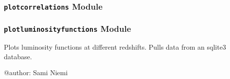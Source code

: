 \documentclass[letterpaper,10pt,english]{sphinxmanual}
\begin{document}
\begin{fulllineitems}
\label{SamPy.herschel:SamPy.herschel.plotcolourproperties.plotProperties}
\end{fulllineitems}



\subsubsection{\texttt{plotcorrelations} Module}
\label{SamPy.herschel:plotcorrelations-module}\label{SamPy.herschel:module-SamPy.herschel.plotcorrelations}

\begin{fulllineitems}
\label{SamPy.herschel:SamPy.herschel.plotcorrelations.plot_correlation}
\end{fulllineitems}



\subsubsection{\texttt{plotluminosityfunctions} Module}
\label{SamPy.herschel:plotluminosityfunctions-module}\label{SamPy.herschel:module-SamPy.herschel.plotluminosityfunctions}
Plots luminosity functions at different redshifts.
Pulls data from an sqlite3 database.

@author: Sami Niemi

\end{document}
